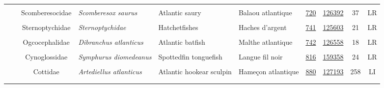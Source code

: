 \documentclass[12pt]{article}\usepackage[]{graphicx}\usepackage[]{color}
\begin{document}
\begin{landscape}
\begin{longtable}[t]{ccc>{\centering\arraybackslash}p{3cm}>{\centering\arraybackslash}p{3cm}>{\centering\arraybackslash}p{3cm}>{}c>{}ccc}
\nopagebreak
\addlinespace[0.3em]
\\
\hspace{1em}\hspace{1em} &  & Scomberesocidae & \em{Scomberesox saurus} & Atlantic saury & Balaou atlantique & \href{#sec:720}{720} & \href{http://www.marinespecies.org/aphia.php?p=taxdetails&id=126392}{126392} & 37 & LR\\
\nopagebreak
\addlinespace[0.3em]
\\
\hspace{1em}\hspace{1em} &  & Sternoptychidae & \em{Sternoptychidae} & Hatchetfishes & Haches d'argent & \href{#sec:741}{741} & \href{http://www.marinespecies.org/aphia.php?p=taxdetails&id=125603}{125603} & 21 & LR\\
\nopagebreak
\addlinespace[0.3em]
\\
\hspace{1em}\hspace{1em} &  & Ogcocephalidae & \em{Dibranchus atlanticus} & Atlantic batfish & Malthe atlantique & \href{#sec:742}{742} & \href{http://www.marinespecies.org/aphia.php?p=taxdetails&id=126558}{126558} & 18 & LR\\
\nopagebreak
\addlinespace[0.3em]
\\
\hspace{1em}\hspace{1em} &  & Cynoglossidae & \em{Symphurus diomedeanus} & Spottedfin tonguefish & Langue fil noir & \href{#sec:816}{816} & \href{http://www.marinespecies.org/aphia.php?p=taxdetails&id=159358}{159358} & 24 & LR\\
\nopagebreak
\addlinespace[0.3em]
\\
\hspace{1em}\hspace{1em} &  & Cottidae & \em{Artediellus atlanticus} & Atlantic hookear sculpin & Hameçon atlantique & \href{#sec:880}{880} & \href{http://www.marinespecies.org/aphia.php?p=taxdetails&id=127193}{127193} & 258 & LI\\
\pagebreak[0]
\addlinespace[0.3em]
\\
\addlinespace[0.3em]
\\

\end{longtable}
\end{landscape}
\end{document}
